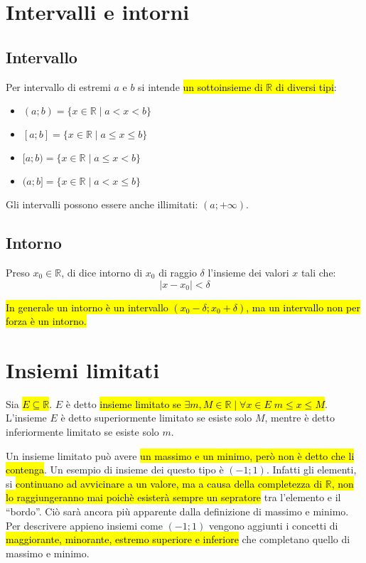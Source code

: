 \section{Intervalli e intorni}
\subsection{Intervallo}
Per intervallo di estremi $a$ e $b$ si intende \hl{un sottoinsieme di
$\mathbb{R}$ di diversi tipi}:
\begin{itemize}
    \item $(a;b) = \{ x\in\mathbb{R} \mid a<x<b\}$
    \item $[a;b] = \{ x\in\mathbb{R}\mid a \leq x \leq b\}$
    \item $[a;b) = \{ x\in\mathbb{R}\mid a \leq x < b\}$
    \item $(a;b] = \{ x\in\mathbb{R}\mid a < x \leq b\}$
\end{itemize}

Gli intervalli possono essere anche illimitati: $(a; +\infty)$.

\subsection{Intorno}
Preso $x_0 \in \mathbb{R}$, di dice intorno di $x_0$ di raggio $\delta$ 
l'insieme dei valori $x$ tali che:
\[ |x - x_0| < \delta \]

\hl{In generale un intorno è un intervallo $(x_0 - \delta; x_0 + \delta)$, ma un
intervallo non per forza è un intorno.}

\section{Insiemi limitati}
Sia \hl{$E \subseteq \mathbb{R}$}. $E$ è detto \hl{insieme limitato se 
$\exists m,M \in \mathbb{R} \mid  \forall x \in E \; m \leq x \leq M$}. L'insieme 
$E$ è detto superiormente limitato se esiste solo $M$, mentre è detto 
inferiormente limitato se esiste solo $m$.

Un insieme limitato può avere \hl{un massimo e un minimo, però non è detto
che li contenga}. Un esempio di insieme dei questo tipo è $(-1; 1)$. Infatti 
gli elementi, si \hl{continuano ad avvicinare a un valore, ma a causa della
completezza di $\mathbb{R}$, non lo raggiungeranno mai poichè esisterà sempre 
un sepratore} tra l'elemento e il ``bordo''. Ciò sarà ancora più apparente dalla
definizione di massimo e minimo. Per descrivere appieno insiemi come $(-1;1)$
vengono aggiunti i concetti di \hl{maggiorante, minorante, estremo superiore e 
inferiore} che completano quello di massimo e minimo.

